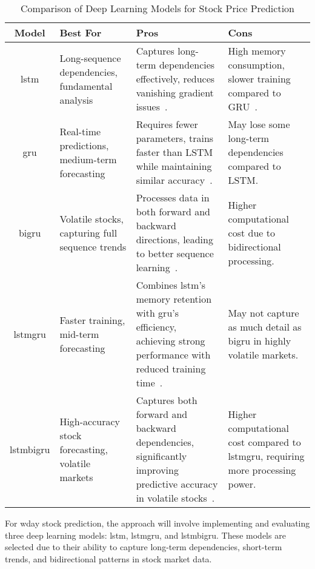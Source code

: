 \begin{table}[H]
    \centering
    \caption{Comparison of Deep Learning Models for Stock Price Prediction}
    \label{tab:stock_models}
    \begin{tabular}{cp{4cm}p{4cm}p{4cm}}
        \hline
        \textbf{Model} & \textbf{Best For} & \textbf{Pros} & \textbf{Cons} \\
        \hline
        \acrshort{lstm} & Long-sequence dependencies, fundamental analysis & Captures
        long-term dependencies effectively, reduces vanishing gradient
        issues~\parencite{shaban2024SMPDL}. & High memory consumption, slower training 
        compared to GRU~\parencite{chang2024StockPrediction}. \\
        \acrshort{gru} & Real-time predictions, medium-term forecasting & Requires 
        fewer parameters, trains faster than LSTM while maintaining similar
        accuracy~\parencite{guo2024LSTMStock}. & May lose some long-term dependencies 
        compared to LSTM. \\
        \acrshort{bigru} & Volatile stocks, capturing full sequence trends & Processes 
        data in both forward and backward directions, leading to better sequence
        learning~\parencite{shaban2024SMPDL}. & Higher computational cost due to 
        bidirectional processing. \\
        \acrshort{lstmgru} & Faster training, mid-term forecasting & 
        Combines \acrshort{lstm}'s memory retention with \acrshort{gru}’s efficiency,
        achieving strong performance with reduced training 
        time~\parencite{chang2024StockPrediction}. & May not capture as much detail as 
        \acrshort{bigru} in highly volatile markets. \\
        \acrshort{lstmbigru} & High-accuracy stock forecasting, volatile markets & 
        Captures both forward and backward dependencies, significantly improving 
        predictive accuracy in volatile stocks~\parencite{shaban2024SMPDL}. & 
        Higher computational cost compared to \acrshort{lstmgru}, requiring more 
        processing power. \\ \hline
    \end{tabular}
\end{table}

For \acrshort{wday} stock prediction, the approach will involve implementing and evaluating 
three deep learning models: \acrshort{lstm}, \acrshort{lstmgru}, and \acrshort{lstmbigru}.
These models are selected due to their ability to capture long-term dependencies, 
short-term trends, and bidirectional patterns in stock market data.

